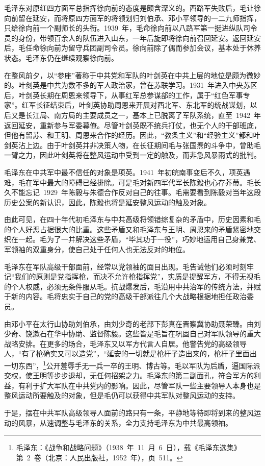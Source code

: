 毛泽东对原红四方面军总指挥徐向前的态度是颇含深义的。西路军失败后，毛让徐向前留在延安，而将原四方面军的将领划归刘伯承、邓小平领导的一二九师指挥，只给徐向前一个副师长的头衔。1939~年，毛命徐向前以八路军第一挺进纵队司令员的身份，带领百余人的队伍进入山东，一年后旋即将徐向前召回延安。返回延安后，毛任命徐向前为留守兵团副司令员。徐向前除了偶而参加会议，基本处于休养状态。毛泽东仍在继续观察徐向前。

在整风前夕，以“参座”著称于中共党和军队的叶剑英在中共上层的地位是颇为微妙的。叶剑英是中共为数不多的军人政治家，曾在苏联学习。1931~年进入中央苏区后，叶剑英长期在周恩来领导下，从事红军总参谋部的工作，属于“红色军事专家”。红军长征结束后，叶剑英协助周恩来开展对西北军、东北军的统战谋划，以后又是长江局、南方局的主要成员之一，基本上已脱离了军队系统，直至~1942~年返回延安，重新参与军委幕僚。尽管叶剑英既不统兵打仗，也无个人的干部班底，但他有留苏、和王明、周恩来合作的经历。因此，“教条主义”和“经验主义”都和叶剑英沾上边。由于叶剑英并非决策人物，在长征期间毛与张国焘的斗争中，曾助毛一臂之力，因此叶剑英将在整风运动中受到一定的触及，而非急风暴雨式的批判。

毛泽东在中共军中最不信任的对象是项英。1941~年初皖南事变后不久，项英遇难，毛在军中最大的障碍已经排除。可是毛对新四军代军长陈毅也心存芥蒂。毛长久不能忘记~1929~年陈毅与朱德合作反对自己的往事。毛需要看到陈毅对当年这段历史公案的新认识，因此，陈毅也将是延安整风运动的触及对象。

由此可见，在四十年代初毛泽东与中共高级将领错综复杂的矛盾中，历史因素和毛的个人好恶占据很大的比重。这些矛盾又和毛泽东与王明、周恩来的矛盾紧密地交织在一起。毛为了一并解决这些矛盾，“毕其功于一役”，巧妙地运用自己身兼党、军领袖的双重身分，使自己处于任何人也无法反对的地位。

毛泽东在军队高级干部面前，经常以党领袖的面目出现。毛告诫他们必须时刻牢记“我们的原则是党指挥枪，而决不允许枪指挥党”，实质是提醒军方，不得无视毛的个人权威，必须无条件服从毛。抗战爆发后，毛沿用中共治军的传统方法，并赋于新的内容。毛将忠实于自己的党的高级干部派往几个大战略根据地担任政治委员。

由邓小平在太行山协助刘伯承，由刘少奇的老部下彭真在晋察冀协助聂荣臻。由刘少奇、饶漱石在华中协助、监督陈毅。这些皆是毛旨在巩固自己对军队领导的重大战略安排。在更多的场合，毛泽东又以军方代言人自居。他警告党的高级领导人，“有了枪确实又可以造党”，“延安的一切就是枪杆子造出来的，枪杆子里面出一切东西”，\footnote{毛泽东：《战争和战略问题》（1938~年~11~月~6~日），载《毛泽东选集》第~2~卷（北京：人民出版社，1952~年），页~511。}公开羞辱手无一兵一卒的王明、博古等。毛以军队为后盾，逼国际派交权，使王明等步步退却，无任何招架之力。毛泽东的第二副面孔，符合军方的利益，有利于扩大军队在中共党内的影响。因此，尽管军队一些主要领导人本身也是整风运动所要触及的对象，但是毛仍可以获得中共军队对整风运动的支持。

于是，摆在中共军队高级领导人面前的路只有一条，平静地等待即将到来的整风运动的风暴，从速调整与毛泽东的关系，全力支持毛泽东为中共最高领袖。